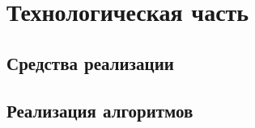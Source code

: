 \documentclass{bmstu}
\begin{document}
\chapter{Технологическая часть}

\section{Средства реализации}



\section{Реализация алгоритмов}
\end{document}
